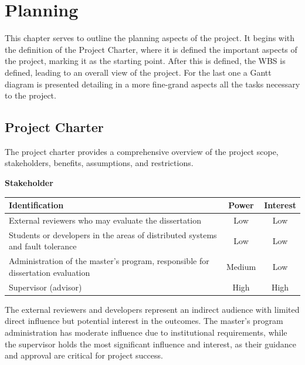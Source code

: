 % 
\chapter{Planning} %


This chapter serves to outline the planning aspects of the project. It begins with the definition of the Project Charter, where it is defined the important aspects of the project, marking it as the starting point. After this is defined, the \gls{WBS} is defined, leading to an overall view of the project. For the last one a Gantt diagram is presented detailing in a more fine-grand aspects all the tasks necessary to the project.

\section{Project Charter}

The project charter provides a comprehensive overview of the project scope, stakeholders, benefits, assumptions, and restrictions.

\noindent \textbf{Stakeholder}

\begin{table}[h!]
    \centering
    \begin{tabular}{|p{11cm}|c|c|}
        \hline
        \textbf{Identification}                                                         & \textbf{Power} & \textbf{Interest} \\ \hline
        External reviewers who may evaluate the dissertation                            & Low            & Low               \\ \hline
        Students or developers in the areas of distributed systems and fault tolerance  & Low            & Low               \\ \hline
        Administration of the master's program, responsible for dissertation evaluation & Medium         & Low               \\ \hline
        Supervisor (advisor)                                                            & High           & High              \\ \hline
    \end{tabular}
\end{table}

The external reviewers and developers represent an indirect audience with limited direct influence but potential interest in the outcomes. The master's program administration has moderate influence due to institutional requirements, while the supervisor holds the most significant influence and interest, as their guidance and approval are critical for project success.

